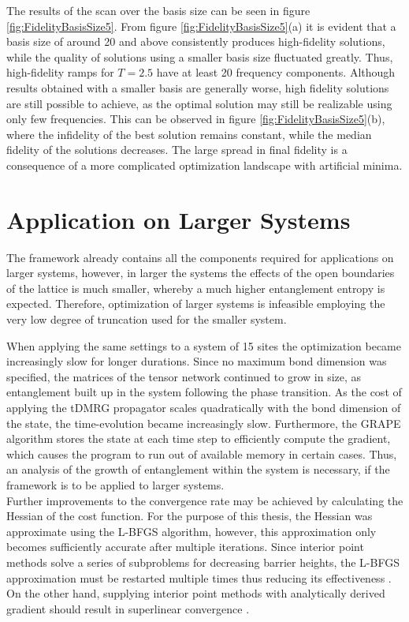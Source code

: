 The results of the scan over the basis size can be seen in figure \ref{fig:FidelityBasisSize5}. From figure \ref{fig:FidelityBasisSize5}(a) it is evident that a basis size of around 20 and above consistently produces high-fidelity solutions, while the quality of solutions using a smaller basis size fluctuated greatly. Thus, high-fidelity ramps for $T = 2.5$ have at least 20 frequency components. Although results obtained with a smaller basis are generally worse, high fidelity solutions are still possible to achieve, as the optimal solution may still be realizable using only few frequencies. This can be observed in figure \ref{fig:FidelityBasisSize5}(b), where the infidelity of the best solution remains constant, while the median fidelity of the solutions decreases. The large spread in final fidelity is a consequence of a more complicated optimization landscape with artificial minima.


\section{Application on Larger Systems} \label{sec:appLargeSystems}

The framework already contains all the components required for applications on larger systems, however, in larger the systems the effects of the open boundaries of the lattice is much smaller, whereby a much higher entanglement entropy is expected. Therefore, optimization of larger systems is infeasible employing the very low degree of truncation used for the smaller system. 

When applying the same settings to a system of 15 sites the optimization became increasingly slow for longer durations. Since no maximum bond dimension was specified, the matrices of the tensor network continued to grow in size, as entanglement built up in the system following the phase transition. As the cost of applying the tDMRG propagator scales quadratically with the bond dimension of the state, the time-evolution became increasingly slow. Furthermore, the GRAPE algorithm stores the state at each time step to efficiently compute the gradient, which causes the program to run out of available memory in certain cases. Thus, an analysis of the growth of entanglement within the system is necessary, if the framework is to be applied to larger systems.\\

Further improvements to the convergence rate may be achieved by calculating the Hessian of the cost function. For the purpose of this thesis, the Hessian was approximate using the L-BFGS algorithm, however, this approximation only becomes sufficiently accurate after multiple iterations. Since interior point methods solve a series of subproblems for decreasing barrier heights, the L-BFGS approximation must be restarted multiple times thus reducing its effectiveness \cite{Wachter2006}. On the other hand, supplying interior point methods with analytically derived gradient should result in superlinear convergence \cite{wright}.

